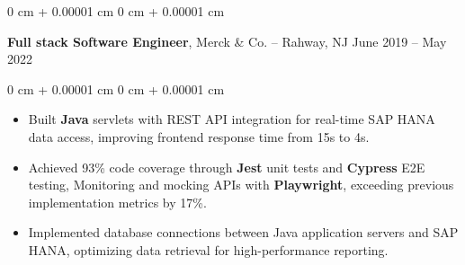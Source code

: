 \documentclass[10pt, letterpaper]{article}
\newenvironment{highlights}{
    \begin{itemize}[
        topsep=0.10 cm,
        parsep=0.10 cm,
        partopsep=0pt,
        itemsep=0pt,
        leftmargin=0 cm + 10pt
    ]
}{
    \end{itemize}
} %
\newenvironment{onecolentry}{
    \begin{adjustwidth}{
        0 cm + 0.00001 cm
    }{
        0 cm + 0.00001 cm
    }
}{
    \end{adjustwidth}
} %
\newenvironment{twocolentry}[2][]{
    \onecolentry
    \def\secondColumn{#2}
    \setcolumnwidth{\fill, 4.5 cm}
    \begin{paracol}{2}
}{
    \switchcolumn \raggedleft \secondColumn
    \end{paracol}
    \endonecolentry
} %
\begin{document}
        \vspace{0.1 cm}
        
        \begin{twocolentry}{
            June 2019 – May 2022
        }
            \textbf{Full stack Software Engineer}, Merck \& Co. -- Rahway, NJ \end{twocolentry}

        \vspace{0.10 cm}
        \begin{onecolentry}
            \begin{highlights}
              
                \item Built \textbf{Java} servlets with REST API integration for real-time SAP HANA data access, improving frontend response time from 15s to 4s.
                \item Achieved 93\% code coverage through \textbf{Jest} unit tests and \textbf{Cypress} E2E testing, Monitoring and mocking APIs with \textbf{Playwright}, exceeding previous implementation metrics by 17\%.
                \item Implemented database connections between Java application servers and SAP HANA, optimizing data retrieval for high-performance reporting.
            \end{highlights}
        \end{onecolentry}
        
        \vspace{0.1 cm}
\end{document}
